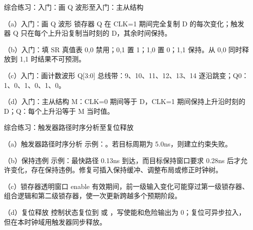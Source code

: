 \begin{chapteranswer}{综合练习：入门：画 Q 波形至入门：主从结构}
\begin{answersubproblem}{（a）入门：画 Q 波形}
锁存器 Q 在 CLK=1 期间完全复制 D 的每次变化；触发器 Q 只在每个上升沿复制当时刻的 D，其余时间保持。
\end{answersubproblem}
\begin{answersubproblem}{（b）入门：填 SR 真值表}
0,0 禁用；0,1 置 1；1,0 置 0；1,1 保持。从 0,0 同时释放到 1,1 时结果不可预测。
\end{answersubproblem}
\begin{answersubproblem}{（c）入门：画计数波形}
Q[3:0] 总线带：9、10、11、12、13、14 逐沿跳变；Q0：1、0、1、0、1、0。
\end{answersubproblem}
\begin{answersubproblem}{（d）入门：主从结构}
M：CLK=0 期间等于 D，CLK=1 期间保持上升沿时刻的 D；Q：每个上升沿等于 M 当时值。
\end{answersubproblem}
\end{chapteranswer}

\begin{chapteranswer}{综合练习：触发器路径时序分析至复位释放}
\begin{answersubproblem}{（a）触发器路径时序分析}
示例：。若目标周期为 5.0ns，则建立约束失败。
\end{answersubproblem}
\begin{answersubproblem}{（b）保持违例}
示例：最快路径 0.13ns 到达，而目标保持窗口要求 0.28ns 后才允许变化，存在保持违例。修复可插入保持缓冲、调整布局或修正时钟树。
\end{answersubproblem}
\begin{answersubproblem}{（c）锁存器透明窗口}
enable 有效期间，前一级输入变化可能穿过第一级锁存器、组合逻辑和第二级锁存器，使一次更新跨越多个预期阶段。
\end{answersubproblem}
\begin{answersubproblem}{（d）复位释放}
控制状态复位到  或 ，写使能和危险输出为 0；复位可异步拉入，但在本时钟域用触发器同步释放。
\end{answersubproblem}
\end{chapteranswer}

